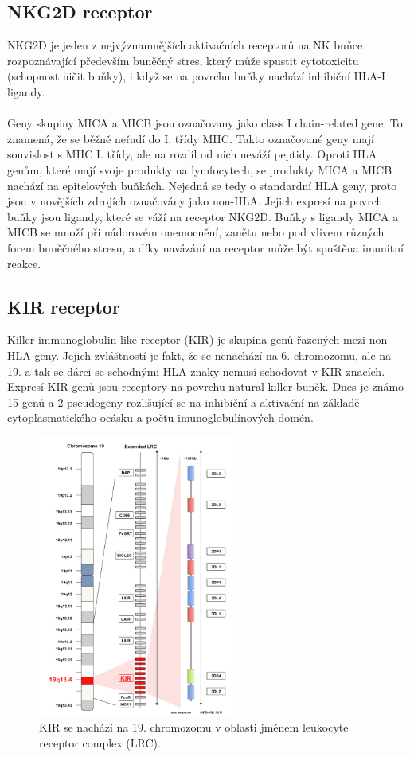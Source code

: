 \documentclass[czech,DP]{thesiskiv}
\numberwithin{equation}{section}
\begin{document}
\subsection{NKG2D receptor}
NKG2D je jeden z nejvýznamnějších aktivačních receptorů na NK buňce rozpoznávající především buněčný stres, který může spustit cytotoxicitu (schopnost ničit buňky), i když se na povrchu buňky nachází inhibiční HLA-I ligandy.  
\\
\\
Geny skupiny MICA a MICB jsou označovany jako class I chain-related gene. To znamená, že se běžně neřadí do I. třídy MHC. Takto označované geny mají souvislost s MHC I. třídy, ale na rozdíl od nich neváží peptidy. Oproti HLA genům, které mají svoje produkty na lymfocytech, se produkty MICA a MICB nachází na epitelových buňkách. Nejedná se tedy o standardní HLA geny, proto jsou v novějších zdrojích označovány jako non-HLA. Jejich expresí na povrch buňky jsou ligandy, které se váží na receptor NKG2D. Buňky s ligandy MICA a MICB se množí při nádorovém onemocnění, zanětu nebo pod vlivem různých forem buněčného stresu, a díky navázání na receptor může být spuštěna imunitní reakce. \cite{transfuzni_lekarstvi} \cite{MIC} \cite{NK_receptors} \cite{imgt_hla_database}


\subsection{KIR receptor}
Killer immunoglobulin-like receptor (KIR) je skupina genů řazených mezi non-HLA geny. Jejich zvláštností je fakt, že se nenachází na 6. chromozomu, ale na 19. a tak se dárci se schodnými HLA znaky nemusí schodovat v KIR znacích. Expresí KIR genů jsou receptory na povrchu natural killer buněk. Dnes je známo 15 genů a 2 pseudogeny rozlišující se na inhibiční a aktivační na základě cytoplasmatického ocásku a počtu imunoglobulínových domén. \citep{KIR_transplantace_jindra}

\begin{figure}[H]		
		\centering
		\includegraphics[width=250px]{./img/kir_pozice.png}
		\caption{KIR se nachází na 19. chromozomu v oblasti jménem leukocyte receptor complex (LRC). \cite{imgt_hla_database}}
		\label{fig:kir_position}
\end{figure}
\end{document}
